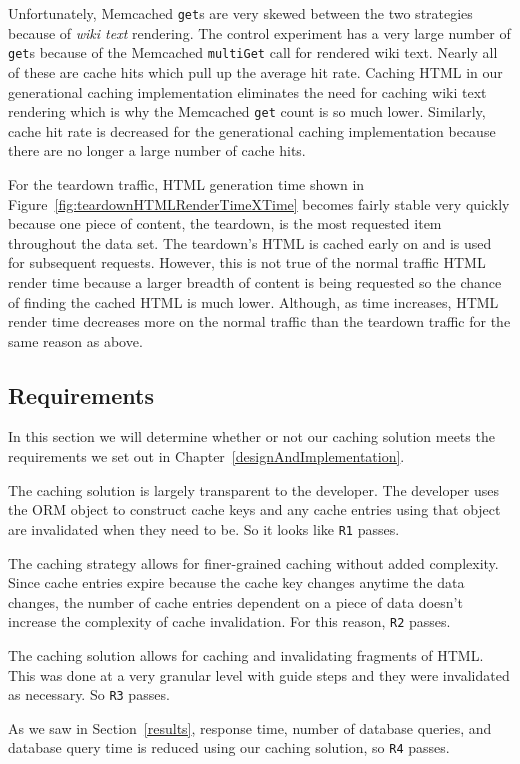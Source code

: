 \documentclass[12pt]{ucthesis}
\begin{document}
Unfortunately, \textsf{Memcached} {\tt get}s are very skewed between the two strategies because of \textit{wiki text} rendering.
The control experiment has a very large number of {\tt get}s because of the \textsf{Memcached} {\tt multiGet} call for rendered wiki text.
Nearly all of these are cache hits which pull up the average hit rate.
Caching HTML in our generational caching implementation eliminates the need for caching wiki text rendering which is why the \textsf{Memcached} {\tt get} count is so much lower.
Similarly, cache hit rate is decreased for the generational caching implementation because there are no longer a large number of cache hits.

For the teardown traffic, HTML generation time shown in Figure~\ref{fig:teardownHTMLRenderTimeXTime} becomes fairly stable very quickly because one piece of content, the teardown, is the most requested item throughout the data set.
The teardown's HTML is cached early on and is used for subsequent requests.
However, this is not true of the normal traffic HTML render time because a larger breadth of content is being requested so the chance of finding the cached HTML is much lower.
Although, as time increases, HTML render time decreases more on the normal traffic than the teardown traffic for the same reason as above.

\subsection{Requirements}
In this section we will determine whether or not our caching solution meets the requirements we set out in Chapter~\ref{designAndImplementation}.

The caching solution is largely transparent to the developer.
The developer uses the ORM object to construct cache keys and any cache entries using that object are invalidated when they need to be.
So it looks like {\tt R1} passes.

The caching strategy allows for finer-grained caching without added complexity.
Since cache entries expire because the cache key changes anytime the data changes, the number of cache entries dependent on a piece of data doesn't increase the complexity of cache invalidation.
For this reason, {\tt R2} passes.

The caching solution allows for caching and invalidating fragments of HTML.
This was done at a very granular level with guide steps and they were invalidated as necessary.
So {\tt R3} passes.

As we saw in Section~\ref{results}, response time, number of database queries, and database query time is reduced using our caching solution, so {\tt R4} passes.
\end{document}
